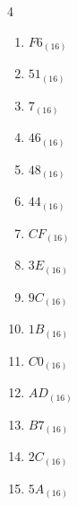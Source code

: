 \begin{multicols}{4}
\begin{enumerate}
        \phantom{$=38$}

  \item $F6_{(16)}$

        \phantom{$=246$}

  \item $51_{(16)}$

        \phantom{$=81$}

  \item $7_{(16)}$

        \phantom{$=7$}

  \item $46_{(16)}$

        \phantom{$=70$}

  \item $48_{(16)}$

        \phantom{$=72$}

  \item $44_{(16)}$

        \phantom{$=68$}

  \item $CF_{(16)}$

        \phantom{$=207$}

\columnbreak %

  \item $3E_{(16)}$

        \phantom{$=62$}

  \item $9C_{(16)}$

        \phantom{$=156$}

  \item $1B_{(16)}$

        \phantom{$=27$}

  \item $C0_{(16)}$

        \phantom{$=192$}

  \item $AD_{(16)}$

        \phantom{$=173$}

  \item $B7_{(16)}$

        \phantom{$=183$}

  \item $2C_{(16)}$

        \phantom{$=44$}

  \item $5A_{(16)}$

        \phantom{$=90$}


\end{enumerate}
\end{multicols}
